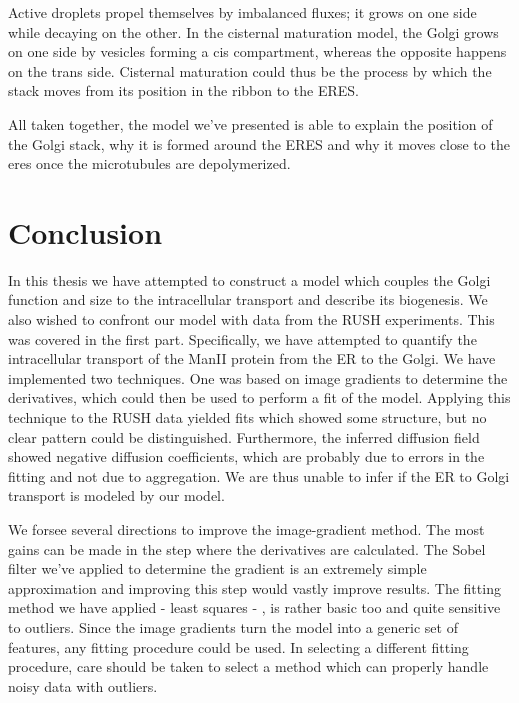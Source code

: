 \documentclass{Dissertate}
\begin{document}
Active droplets propel themselves by imbalanced fluxes; it grows on one
side while decaying on the other. In the cisternal maturation model, the
Golgi grows on one side by vesicles forming a cis compartment, whereas
the opposite happens on the trans side. Cisternal maturation could thus
be the process by which the stack moves from its position in the ribbon
to the ERES.

All taken together, the model we've presented is able to explain the
position of the Golgi stack, why it is formed around the ERES and why it
moves close to the eres once the microtubules are depolymerized.

\hypertarget{conclusion-1}{%
\chapter{Conclusion}\label{conclusion-1}}

In this thesis we have attempted to construct a model which couples the
Golgi function and size to the intracellular transport and describe its
biogenesis. We also wished to confront our model with data from the RUSH
experiments. This was covered in the first part. Specifically, we have
attempted to quantify the intracellular transport of the ManII protein
from the ER to the Golgi. We have implemented two techniques. One was
based on image gradients to determine the derivatives, which could then
be used to perform a fit of the model. Applying this technique to the
RUSH data yielded fits which showed some structure, but no clear pattern
could be distinguished. Furthermore, the inferred diffusion field showed
negative diffusion coefficients, which are probably due to errors in the
fitting and not due to aggregation. We are thus unable to infer if the
ER to Golgi transport is modeled by our model.

We forsee several directions to improve the image-gradient method. The
most gains can be made in the step where the derivatives are calculated.
The Sobel filter we've applied to determine the gradient is an extremely
simple approximation and improving this step would vastly improve
results. The fitting method we have applied - least squares - , is
rather basic too and quite sensitive to outliers. Since the image
gradients turn the model into a generic set of features, any fitting
procedure could be used. In selecting a different fitting procedure,
care should be taken to select a method which can properly handle noisy
data with outliers.
\end{document}
